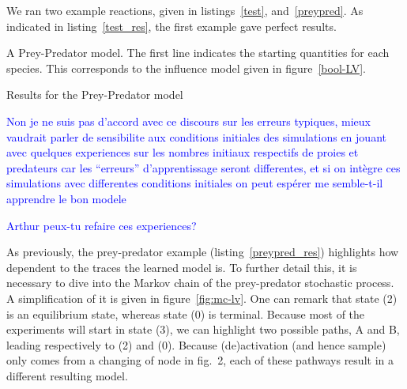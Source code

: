 \documentclass{llncs}
\newcommand{\francois}[1]{\textcolor{blue}{#1}}
\begin{document}
We ran two example reactions, given in listings~\ref{test}, and~\ref{preypred}. As indicated in listing~\ref{test_res}, the first example gave perfect results.

\begin{listfig}[hp]
	
	\caption{A Prey-Predator model. The first line indicates the starting quantities for each species. This corresponds to the influence model given in figure~\ref{bool-LV}.\label{preypred}}
\end{listfig}
\begin{listfig}[hp]
	
	\caption{Results for the Prey-Predator model\label{preypred_res}}
\end{listfig}
\francois{Non je ne suis pas d'accord avec ce discours sur les erreurs typiques,
mieux vaudrait parler de sensibilite aux conditions initiales des simulations
en jouant avec quelques experiences sur les nombres initiaux respectifs de proies et predateurs
car les ``erreurs'' d'apprentissage seront differentes,
et si on intègre ces simulations avec differentes conditions initiales on peut espérer me semble-t-il apprendre le bon modele}

\francois{Arthur peux-tu refaire ces experiences?}

As previously, the prey-predator example (listing~\ref{preypred_res}) highlights how dependent to the traces the learned model is.
To further detail this, it is necessary to dive into the Markov chain of the prey-predator stochastic process. A simplification of it is given in figure~\ref{fig:mc-lv}. One can remark that state (2) is an equilibrium state, whereas state (0) is terminal. Because most of the experiments will start in state (3), we can highlight two possible paths, A and B, leading respectively to (2) and (0). Because (de)activation (and hence sample) only comes from a changing of node in fig.~2, each of these pathways result in a different resulting model.
\end{document}
